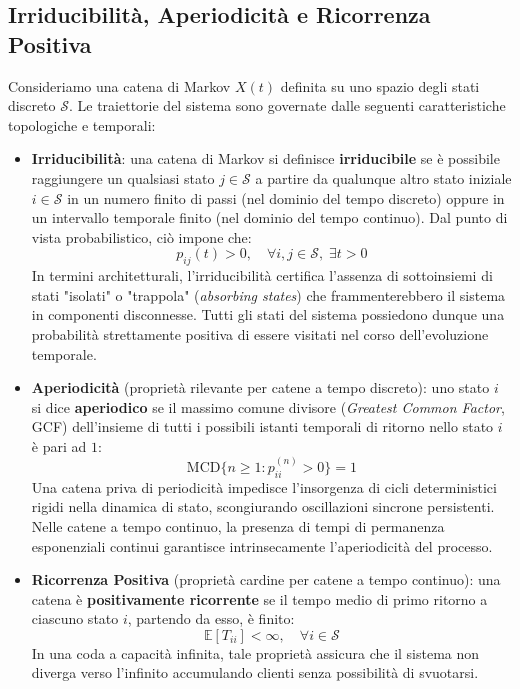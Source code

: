 \documentclass[11pt, a4paper]{article}
\begin{document}
\subsection{Irriducibilità, Aperiodicità e Ricorrenza Positiva}

Consideriamo una catena di Markov $X(t)$ definita su uno spazio degli stati discreto $\mathcal{S}$. Le traiettorie del sistema sono governate dalle seguenti caratteristiche topologiche e temporali:

\begin{itemize}[leftmargin=*]
    \item \textbf{Irriducibilità}: una catena di Markov si definisce \textbf{irriducibile} se è possibile raggiungere un qualsiasi stato $j \in \mathcal{S}$ a partire da qualunque altro stato iniziale $i \in \mathcal{S}$ in un numero finito di passi (nel dominio del tempo discreto) oppure in un intervallo temporale finito (nel dominio del tempo continuo). Dal punto di vista probabilistico, ciò impone che:
    \[
        p_{ij}(t) > 0, \quad \forall i, j \in \mathcal{S}, \; \exists t > 0
    \]
    In termini architetturali, l'irriducibilità certifica l'assenza di sottoinsiemi di stati "isolati" o "trappola" (\emph{absorbing states}) che frammenterebbero il sistema in componenti disconnesse. Tutti gli stati del sistema possiedono dunque una probabilità strettamente positiva di essere visitati nel corso dell'evoluzione temporale.

    \item \textbf{Aperiodicità} (proprietà rilevante per catene a tempo discreto): uno stato $i$ si dice \textbf{aperiodico} se il massimo comune divisore (\emph{Greatest Common Factor}, GCF) dell'insieme di tutti i possibili istanti temporali di ritorno nello stato $i$ è pari ad $1$:
    \[
        \mathrm{MCD}\{n \ge 1 : p_{ii}^{(n)} > 0\} = 1
    \]
    Una catena priva di periodicità impedisce l'insorgenza di cicli deterministici rigidi nella dinamica di stato, scongiurando oscillazioni sincrone persistenti. Nelle catene a tempo continuo, la presenza di tempi di permanenza esponenziali continui garantisce intrinsecamente l'aperiodicità del processo.

    \item \textbf{Ricorrenza Positiva} (proprietà cardine per catene a tempo continuo): una catena è \textbf{positivamente ricorrente} se il tempo medio di primo ritorno a ciascuno stato $i$, partendo da esso, è finito:
    \[
        \mathbb{E}[T_{ii}] < \infty, \quad \forall i \in \mathcal{S}
    \]
    In una coda a capacità infinita, tale proprietà assicura che il sistema non diverga verso l'infinito accumulando clienti senza possibilità di svuotarsi.
\end{itemize}
\end{document}
